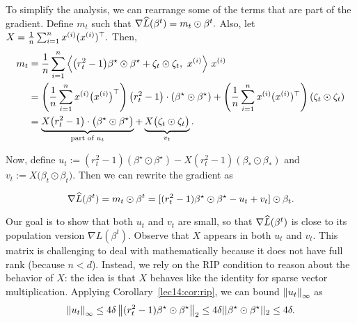 To simplify the analysis, we can rearrange some of the terms that are part of the gradient. Define $m_{t} $ such that $\nabla \empLt = m_{t} \odot \beta^{t}.$ Also, let $X = \frac{1}{n} \sum_{i=1}^{n} x\sp{i}(x\sp{i})^\top.$ Then,
\begin{align}
    m_{t} &= \frac{1}{n} \sum_{i=1}^{n} \Big\langle \big(r_{t}^{2} - 1\big) \beta^\star \odot \beta^\star + \zeta_{t} \odot \zeta_{t}, \ x\sp{i}  \Big\rangle \ x\sp{i} \\
    &= \l( \frac{1}{n} \sum_{i=1}^{n} x\sp{i}\big(x\sp{i}\big)^\top \r) \l(r_{t}^{2} - 1\r) \cdot \l(\beta^\star \odot \beta^\star\r) + \l( \frac{1}{n} \sum_{i=1}^{n} x\sp{i}(x\sp{i})^\top \r) \l(\zeta_{t} \odot \zeta_{t}\r) \\
    &= \underbrace{X \big(r_{t}^{2} - 1\big) \cdot \big(\beta^\star \odot \beta^\star\big)}_{\text{part of } u_t} + \underbrace{X \big(\zeta_{t} \odot \zeta_{t}\big)}_{v_t}.
\end{align}

Now, define $u_{t} := (r_{t}^{2} - 1) (\beta^\star \odot \beta^\star) - X (r_{t}^{2} - 1) (\beta_{*} \odot \beta_{*})$ and $v_{t} := X \big(\beta_{t} \odot \beta_{t}\big)$. Then we can rewrite the gradient as

\begin{equation}
    \nabla \empLt = m_{t} \odot \beta^{t} = [(r_{t}^{2} -1) \beta^\star \odot \beta^\star - u_{t} + v_{t}] \odot \beta_{t}. \label{lec14:eqn:emp-gradient}
\end{equation}

Our goal is to show that both $u_t$ and $v_t$ are small, so that $\nabla \empLt$ is close to its population version $\nabla L(\beta^t)$. Observe that $X$ appears in both $u_{t}$ and $v_{t}$. This matrix is challenging to deal with mathematically because it does not have full rank (because $n < d$). Instead, we rely on the RIP condition to reason about the behavior of $X$: the idea is that $X$ behaves like the identity for sparse vector multiplication. Applying Corollary~\ref{lec14:cor:rip}, we can bound $\Norm{u_{t}}_{\infty}$ as
\begin{equation} \label{lec14:eqn:u-inf-norm}
    \Norm{u_{t}}_{\infty} \leq 4\delta \Norm{(r_t^2 - 1)  \beta^\star \odot \beta^\star }_{2} 
    \leq 4\delta ||\beta^\star \odot \beta^\star||_{2} \leq 4\delta.
\end{equation}

